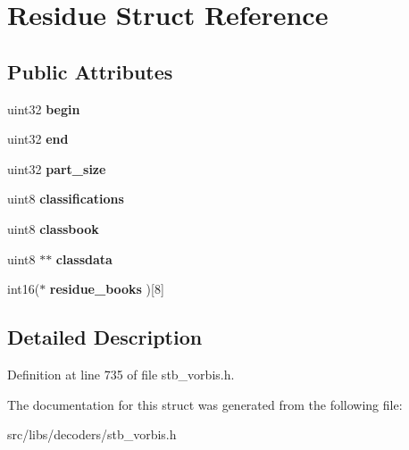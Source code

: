 \hypertarget{structResidue}{\section{Residue Struct Reference}
\label{structResidue}
}
\subsection*{Public Attributes}
\begin{DoxyCompactItemize}
\item 
\hypertarget{structResidue_ad6316cbcc989ab6c2d85147cc7effeca}{uint32 {\bfseries begin}}\label{structResidue_ad6316cbcc989ab6c2d85147cc7effeca}

\item 
\hypertarget{structResidue_a79e5b0b56d8d18fbf350e8f9d7841f8e}{uint32 {\bfseries end}}\label{structResidue_a79e5b0b56d8d18fbf350e8f9d7841f8e}

\item 
\hypertarget{structResidue_a88f3f7afce7f7ef97a62c71e5b7fbf3b}{uint32 {\bfseries part\-\_\-size}}\label{structResidue_a88f3f7afce7f7ef97a62c71e5b7fbf3b}

\item 
\hypertarget{structResidue_a7990d602ad1221a4074bd3fb2b6396e4}{uint8 {\bfseries classifications}}\label{structResidue_a7990d602ad1221a4074bd3fb2b6396e4}

\item 
\hypertarget{structResidue_a2162b2f7f3ac4358a2983f5d372741b1}{uint8 {\bfseries classbook}}\label{structResidue_a2162b2f7f3ac4358a2983f5d372741b1}

\item 
\hypertarget{structResidue_a079f9b89fb84d8cec7829a640c0f0f85}{uint8 $\ast$$\ast$ {\bfseries classdata}}\label{structResidue_a079f9b89fb84d8cec7829a640c0f0f85}

\item 
\hypertarget{structResidue_ad8abf85a933f167664f1113b8c0b83a8}{int16($\ast$ {\bfseries residue\-\_\-books} )\mbox{[}8\mbox{]}}\label{structResidue_ad8abf85a933f167664f1113b8c0b83a8}

\end{DoxyCompactItemize}


\subsection{Detailed Description}


Definition at line 735 of file stb\-\_\-vorbis.\-h.



The documentation for this struct was generated from the following file\-:\begin{DoxyCompactItemize}
\item 
src/libs/decoders/stb\-\_\-vorbis.\-h\end{DoxyCompactItemize}
